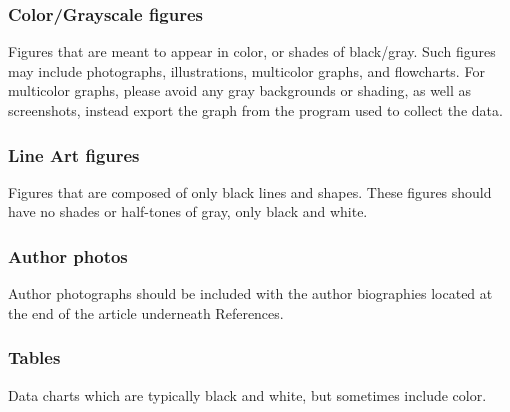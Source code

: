 \documentclass{ieeeaccess}
\begin{document}
\subsubsection{Color/Grayscale figures}
{Figures that are meant to appear in color, or shades of black/gray. Such
	figures may include photographs, illustrations, multicolor graphs, and
	flowcharts. For multicolor graphs, please avoid any gray backgrounds or shading, as well as screenshots, instead export the graph from the program used to collect the data.}

\subsubsection{Line Art figures}
{Figures that are composed of only black lines and shapes. These figures
	should have no shades or half-tones of gray, only black and white.}

\subsubsection{Author photos}
{Author photographs should be included with the author biographies located at the end of the article underneath References. }

\subsubsection{Tables}
{Data charts which are typically black and white, but sometimes include
	color.}
\end{document}
